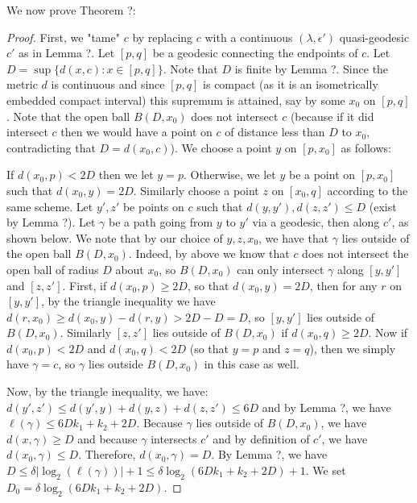 \documentclass[12pt]{article}
\newcommand{\vs}{\vskip10pt}
\begin{document}
	\vs 
	
	We now prove Theorem ?: 
	
	\begin{proof}
		
		First, we "tame" $c$ by replacing $c$ with a continuous $(\lambda, \epsilon')$ quasi-geodesic $c'$ as in Lemma ?. Let $[p,q]$ be a geodesic connecting the endpoints of $c$. Let $D = \sup \{d(x,c): x \in [p,q]\}$. Note that $D$ is finite by Lemma ?. Since the metric $d$ is continuous and since $[p,q]$ is compact (as it is an isometrically embedded compact interval) this supremum is attained, say by some $x_0$ on $[p,q]$. Note that the open ball $B(D, x_0)$ does not intersect $c$ (because if it did intersect $c$ then we would have a point on $c$ of distance less than $D$ to $x_0$, contradicting that $D = d(x_0,c)$). We choose a point $y$ on $[p,x_0]$ as follows: 
		
		\vs 
		
		If $d(x_0, p) < 2D$ then we let $y = p$. Otherwise, we let $y$ be a point on $[p, x_0]$ such that $d(x_0, y) = 2D$. Similarly choose a point $z$ on $[x_0, q]$ according to the same scheme. Let $y', z'$ be points on $c$ such that $d(y, y'), d(z, z') \leq D$ (exist by Lemma ?). Let $\gamma$ be a path going from $y$ to $y'$ via a geodesic, then along $c'$, as shown below. We note that by our choice of $y,z,x_0$, we have that $\gamma$ lies outside of the open ball $B(D, x_0)$. Indeed, by above we know that $c$ does not intersect the open ball of radius $D$ about $x_0$, so $B(D, x_0)$ can only intersect $\gamma$ along $[y, y']$ and $[z, z']$. First, if $d(x_0, p) \geq 2D$, so that $d(x_0, y) = 2D$, then for any $r$ on $[y, y']$, by the triangle inequality we have $d(r, x_0) \geq d(x_0, y) - d(r,y) > 2D - D = D$, so $[y, y']$ lies outside of $B(D, x_0)$. Similarly $[z,z']$ lies outside of $B(D, x_0)$ if $d(x_0, q) \geq 2D$. Now if $d(x_0, p) < 2D$ and $d(x_0, q) < 2D$ (so that $y =p$ and $z = q$), then we simply have $\gamma = c$, so $\gamma$ lies outside $B(D, x_0)$ in this case as well. 
		
		\vs
		
		Now, by the triangle inequality, we have: $d(y', z') \leq d(y', y) + d(y,z) + d(z, z') \leq 6 D$ and by Lemma ?, we have $\ell(\gamma) \leq 6Dk_1 + k_2 + 2D$. Because $\gamma$ lies outside of $B(D, x_0)$, we have $d(x, \gamma) \geq D$ and because $\gamma$ intersects $c'$ and by definition of $c'$, we have $d(x_0, \gamma) \leq D$. Therefore, $d(x_0, \gamma) = D$. By Lemma ?, we have $D \leq \delta \vert \log_2 (\ell(\gamma)) \vert + 1 \leq \delta \log_2 (6 D k_1 + k_2 + 2D) + 1$. We set $D_0 = \delta \log_2 (6 D k_1 + k_2 + 2D)$. 
		

\end{proof}
\end{document}
